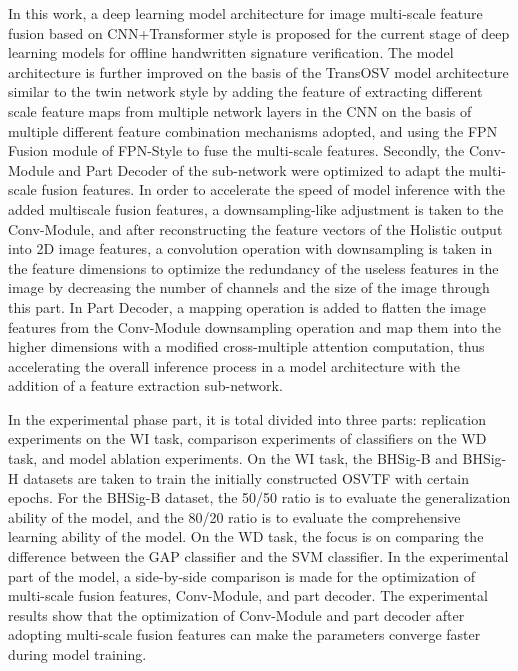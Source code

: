 In this work, a deep learning model architecture for image multi-scale feature fusion based on CNN+Transformer style is proposed for the current stage of deep learning models for offline handwritten signature verification. The model architecture is further improved on the basis of the TransOSV model architecture similar to the twin network style by adding the feature of extracting different scale feature maps from multiple network layers in the CNN on the basis of multiple different feature combination mechanisms adopted, and using the FPN Fusion module of FPN-Style to fuse the multi-scale features. Secondly, the Conv-Module and Part Decoder of the sub-network were optimized to adapt the multi-scale fusion features. In order to accelerate the speed of model inference with the added multiscale fusion features, a downsampling-like adjustment is taken to the Conv-Module, and after reconstructing the feature vectors of the Holistic output into 2D image features, a convolution operation with downsampling is taken in the feature dimensions to optimize the redundancy of the useless features in the image by decreasing the number of channels and the size of the image through this part. In Part Decoder, a mapping operation is added to flatten the image features from the Conv-Module downsampling operation and map them into the higher dimensions with a modified cross-multiple attention computation, thus accelerating the overall inference process in a model architecture with the addition of a feature extraction sub-network.

In the experimental phase part, it is total divided into three parts: replication experiments on the WI task, comparison experiments of classifiers on the WD task, and model ablation experiments. On the WI task, the BHSig-B and BHSig-H datasets are taken to train the initially constructed OSVTF with certain epochs. For the BHSig-B dataset, the 50/50 ratio is to evaluate the generalization ability of the model, and the 80/20 ratio is to evaluate the comprehensive learning ability of the model. On the WD task, the focus is on comparing the difference between the GAP classifier and the SVM classifier. In the experimental part of the model, a side-by-side comparison is made for the optimization of multi-scale fusion features, Conv-Module, and part decoder. The experimental results show that the optimization of Conv-Module and part decoder after adopting multi-scale fusion features can make the parameters converge faster during model training.

